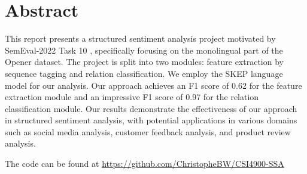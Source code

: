\section*{Abstract}

This report presents a structured sentiment analysis project motivated by SemEval-2022 Task 10 \cite{barnes-etal-2022-semeval}, specifically focusing on the monolingual part of the Opener dataset. The project is split into two modules: feature extraction by sequence tagging and relation classification. We employ the SKEP language model for our analysis. Our approach achieves an F1 score of 0.62 for the feature extraction module and an impressive F1 score of 0.97 for the relation classification module. Our results demonstrate the effectiveness of our approach in structured sentiment analysis, with potential applications in various domains such as social media analysis, customer feedback analysis, and product review analysis.

The code can be found at \url{https://github.com/ChristopheBW/CSI4900-SSA}